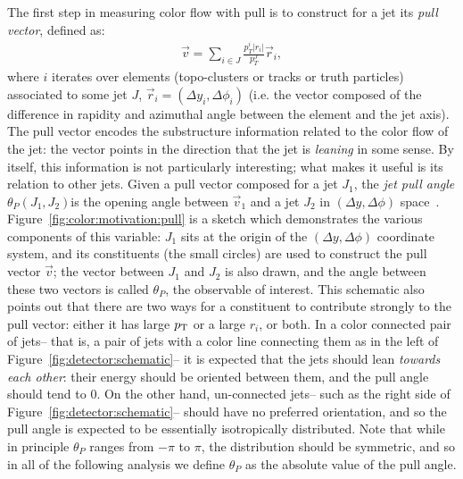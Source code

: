 The first step in measuring color flow with pull is to construct for a jet its \textit{pull vector}, defined as:
%
\begin{align}
\vec{v} = \sum_{i\in J} \frac{p_T^i |r_i|}{p_T^{J}}\vec{r}_i,
\end{align}
%
where $i$ iterates over elements (topo-clusters or tracks or truth particles) associated to some jet $J$, $\vec{r}_i = (\Delta y_i,\Delta\phi_i)$ (i.e. the vector composed of the difference in rapidity and azimuthal angle between the element and the jet axis). The pull vector encodes the substructure information related to the color flow of the jet: the vector points in the direction that the jet is \textit{leaning} in some sense. By itself, this information is not particularly interesting; what makes it useful is its relation to other jets. Given a pull vector composed for a jet $J_1$, the \textit{jet pull angle} $\theta_P(J_1, J_2)$is the opening angle between $\vec{v}_1$ and a jet $J_2$ in $(\Delta y,\Delta\phi)$ space~\cite{Gallicchio:2010sw}. Figure~\ref{fig:color:motivation:pull} is a sketch which demonstrates the various components of this variable: $J_1$ sits at the origin of the $(\Delta y,\Delta\phi)$ coordinate system, and its constituents (the small circles) are used to construct the pull vector $\vec{v}$; the vector between $J_1$ and $J_2$ is also drawn, and the angle between these two vectors is called $\theta_P$, the observable of interest. This schematic also points out that there are two ways for a constituent to contribute strongly to the pull vector: either it has large $p_{\text{T}}$ or a large $r_i$, or both. In a color connected pair of jets-- that is, a pair of jets with a color line connecting them as in the left of Figure~\ref{fig:detector:schematic}-- it is expected that the jets should lean \textit{towards each other}: their energy should be oriented between them, and the pull angle should tend to 0. On the other hand, un-connected jets-- such as the right side of Figure~\ref{fig:detector:schematic}-- should have no preferred orientation, and so the pull angle is expected to be essentially isotropically distributed. Note that while in principle $\theta_P$ ranges from $-\pi$ to $\pi$, the distribution should  be symmetric, and so in all of the following analysis we define $\theta_P$ as the absolute value of the pull angle.




